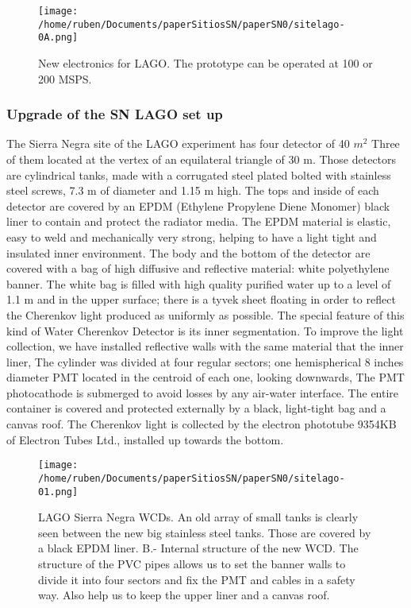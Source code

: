 \documentclass[a4paper]{article}
\begin{document}
\begin{figure}[t]
\centering
\texttt{[image: /home/ruben/Documents/paperSitiosSN/paperSN0/sitelago-0A.png]}
\caption{New electronics for LAGO. The prototype can be operated at 100 or 200 MSPS.}
\label{sitelago0A}
\end{figure} 




\subsubsection{Upgrade of the SN LAGO set up}

The Sierra Negra site of the LAGO experiment has four detector of 40 $m^{2}$
Three of them located at the vertex of an equilateral triangle of 30 m. 
Those detectors are cylindrical tanks, made with a corrugated steel plated
bolted with stainless steel screws, 7.3 m of diameter and 1.15 m high. The
tops and inside of each detector are covered by an EPDM (Ethylene Propylene
Diene Monomer) black liner to contain and protect the radiator media.
The EPDM material is elastic, easy to weld and mechanically very strong,
helping to have a light tight and insulated inner environment. The body and
the bottom of the detector are covered with a bag of high diffusive and
reflective material: white polyethylene banner. The white bag is filled with
high quality purified water up to a level of 1.1 m and in the upper surface;
there is a tyvek sheet floating in order to reflect the Cherenkov light
produced as uniformly as possible. The special feature of this kind of Water
Cherenkov Detector is its inner segmentation. To improve the light collection,
we have installed reflective walls with the same material that the inner liner,
The cylinder was divided at four regular sectors; one hemispherical 8 inches
diameter PMT located in the centroid of each one, looking downwards, The PMT
photocathode is submerged to avoid losses by any air-water interface. The
entire container is covered and protected externally by a black, light-tight
bag and a canvas roof. The Cherenkov light is collected by the
electron phototube 9354KB of Electron Tubes Ltd., installed up towards the 
bottom.
\begin{figure}[t]
\centering
\texttt{[image: /home/ruben/Documents/paperSitiosSN/paperSN0/sitelago-01.png]}
\caption{LAGO Sierra Negra WCDs. An old array of small tanks is clearly seen between the new big stainless steel tanks. 
Those are covered by a black EPDM liner. B.- Internal structure of the new WCD. The structure of the PVC pipes allows us to 
set the banner walls to divide it into four sectors and fix the PMT and cables in a safety way. Also help us to keep 
the upper liner and a canvas roof.}
\label{sitelago01}
\end{figure} 
\end{document}
